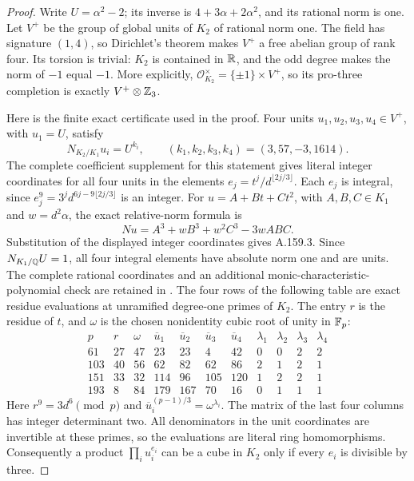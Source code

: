 \begin{proof}
Write \(U=\alpha^2-2\); its inverse is
\(4+3\alpha+2\alpha^2\), and its rational norm is one.
Let \(V^+\) be the group of global units of \(K_2\) of rational norm one.
The field has signature \((1,4)\), so Dirichlet's theorem makes \(V^+\)
a free abelian group of rank four.  Its torsion is trivial: \(K_2\) is
contained in \(\mathbb R\), and the odd degree makes the norm of \(-1\) equal
\(-1\).  More explicitly,
\(\mathcal O_{K_2}^{\times}=\{\pm1\}\times V^+\),
so its pro-three completion is exactly \(V^+\otimes\mathbb Z_3\).

Here is the finite exact certificate used in the proof.  Four units
\(u_1,u_2,u_3,u_4\in V^+\), with \(u_1=U\), satisfy
\[
 N_{K_2/K_1}u_i=U^{k_i},\qquad
 (k_1,k_2,k_3,k_4)=(3,57,-3,1614).
\tag{A.159.3}
\]
The complete coefficient supplement for this statement gives literal
integer coordinates for all four units in the elements
\(e_j=t^j/d^{\lfloor2j/3\rfloor}\).  Each \(e_j\) is integral,
since \(e_j^9=3^j d^{6j-9\lfloor2j/3\rfloor}\) is an integer.
For \(u=A+Bt+Ct^2\), with \(A,B,C\in K_1\) and \(w=d^2\alpha\),
the exact relative-norm formula is
\[
                 Nu=A^3+wB^3+w^2C^3-3wABC.
\]
Substitution of the displayed integer coordinates gives A.159.3.
Since \(N_{K_1/\mathbb Q}U=1\), all four integral elements have absolute
norm one and are units.  The complete rational coordinates and an
additional monic-characteristic-polynomial check are retained in
.
The four rows of the following table are exact residue evaluations at
unramified degree-one primes of \(K_2\).  The entry \(r\) is the residue
of \(t\), and \(\omega\) is the chosen nonidentity cubic root of unity
in \(\mathbb F_p\):
\[
\begin{array}{c|r|r|rrrr|rrrr}
 p&r&\omega&\overline u_1&\overline u_2&\overline u_3&\overline u_4
 &\lambda_1&\lambda_2&\lambda_3&\lambda_4\\\hline
61&27&47&23&23&4&42&0&0&2&2\\
103&40&56&62&82&62&86&2&1&2&1\\
151&33&32&114&96&105&120&1&2&2&1\\
193&8&84&179&167&70&16&0&1&1&1
\end{array}
\tag{A.159.4}
\]
Here \(r^9=3d^6\pmod p\) and
\(\overline u_i^{(p-1)/3}=\omega^{\lambda_i}\).
The matrix of the last four columns has integer determinant two.
All denominators in the unit coordinates are invertible at these primes,
so the evaluations are literal ring homomorphisms.  Consequently a product
\(\prod_i u_i^{e_i}\) can be a cube in \(K_2\) only if every
\(e_i\) is divisible by three.


\end{proof}

